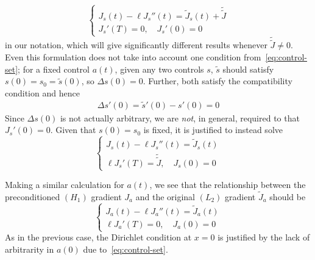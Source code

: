 \documentclass[letterpaper, 10pt, draft]{amsart}
\theoremstyle{definition}
\theoremstyle{remark}
\begin{document}
\begin{equation*}
  \begin{cases}
    J_s(t) - \ell J_s''(t) = \tilde{J}_s(t) + \tilde{\tilde{J}}
    \\
    J_s'(T) = 0,\quad
    J_s'(0) = 0
  \end{cases}
\end{equation*}
in our notation, which will give significantly different results whenever
$\tilde{\tilde{J}}\neq 0$.
Even this formulation does not take into account one condition
from~\eqref{eq:control-set}; for a fixed control $a(t)$, given any two controls
$s$, $\tilde{s}$ should satisfy $s(0)=s_0=\tilde{s}(0)$, so ${\Delta s}(0) = 0$.
Further, both satisfy the compatibility condition and hence
\begin{gather*}
  {\Delta s}'(0) = \tilde{s}'(0) - s'(0) = 0
\end{gather*}
Since ${\Delta s}(0)$ is not actually arbitrary, we are \emph{not}, in general,
required to that $J_s'(0)=0$.
Given that $s(0)=s_0$ is fixed, it is justified to instead solve
\begin{equation}
  \begin{cases}
  J_s(t) - \ell J_s''(t) = \tilde{J}_s(t)
  \\
  \ell J_s'(T) = \tilde{\tilde{J}},\quad
  J_s(0) = 0
\end{cases}\label{eq:gradient-s-precond}
\end{equation}

Making a similar calculation for $a(t)$, we see that the relationship between
the preconditioned $(H_1)$ gradient $J_a$ and the original $(L_2)$ gradient
$\tilde{J}_a$ should be
\begin{equation}
  \begin{cases}
  J_a(t) - \ell J_a''(t) = \tilde{J}_a(t)\nonumber
  \\
  \ell J_a'(T) = 0,\quad
  J_a(0) = 0
  \end{cases}\label{eq:gradient-a-precond}
\end{equation}
As in the previous case, the Dirichlet condition at $x=0$ is justified by the
lack of arbitrarity in $a(0)$ due to~\eqref{eq:control-set}.
\end{document}
